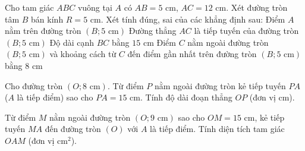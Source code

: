 \begin{ex}%
	Cho tam giác $ABC$ vuông tại $A$ có $AB = 5\text{ cm}$, $AC = 12\text{ cm}$. Xét đường tròn tâm $B$ bán kính $R = 5\text{ cm}$. Xét tính đúng, sai của các khẳng định sau:
	\choiceTF
	{\True Điểm $A$ nằm trên đường tròn $(B; 5\text{ cm})$}
	{\True Đường thẳng $AC$ là tiếp tuyến của đường tròn $(B; 5\text{ cm})$}
	{Độ dài cạnh $BC$ bằng $15\text{ cm}$}
	{\True Điểm $C$ nằm ngoài đường tròn $(B; 5\text{ cm})$ và khoảng cách từ $C$ đến điểm gần nhất trên đường tròn $(B; 5\text{ cm})$ bằng $8\text{ cm}$}
\end{ex}

\begin{bt}%
	Cho đường tròn $(O; 8\text{ cm})$. Từ điểm $P$ nằm ngoài đường tròn kẻ tiếp tuyến $PA$ ($A$ là tiếp điểm) sao cho $PA = 15\text{ cm}$. Tính độ dài đoạn thẳng $OP$ (đơn vị cm).
\end{bt}

\begin{bt}%
	Từ điểm $M$ nằm ngoài đường tròn $(O; 9\text{ cm})$ sao cho $OM = 15\text{ cm}$, kẻ tiếp tuyến $MA$ đến đường tròn $(O)$ với $A$ là tiếp điểm. Tính diện tích tam giác $OAM$ (đơn vị $\text{cm}^2$).
\end{bt}

